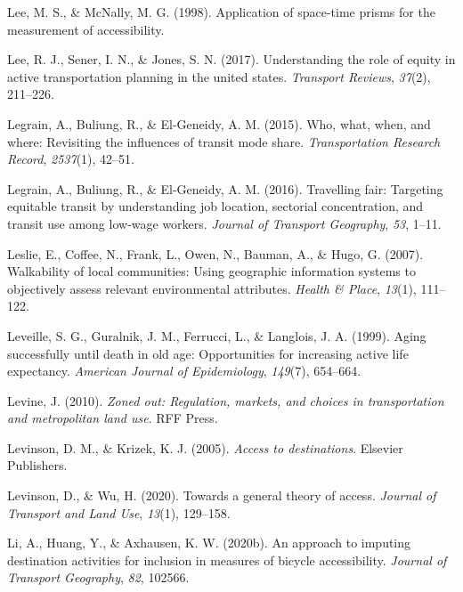 \documentclass[
11pt, %
oneside, %
english, %
singlespacing, %
]{macthesis} %
\newlength{\cslhangindent}
\newenvironment{CSLReferences}[2] %
{\begin{list}{}{%
	\setlength{\itemindent}{0pt}
	\setlength{\leftmargin}{0pt}
	\setlength{\parsep}{0pt}
	\ifodd #1
	\setlength{\leftmargin}{\cslhangindent}
	\setlength{\itemindent}{-1\cslhangindent}
	\fi
	\setlength{\itemsep}{#2\baselineskip}}}
{\end{list}}
\begin{document}
\begin{CSLReferences}{1}{0}
Lee, M. S., \& McNally, M. G. (1998). Application of space-time prisms for the measurement of accessibility.

Lee, R. J., Sener, I. N., \& Jones, S. N. (2017). Understanding the role of equity in active transportation planning in the united states. \emph{Transport Reviews}, \emph{37}(2), 211--226.

Legrain, A., Buliung, R., \& El-Geneidy, A. M. (2015). Who, what, when, and where: Revisiting the influences of transit mode share. \emph{Transportation Research Record}, \emph{2537}(1), 42--51.

Legrain, A., Buliung, R., \& El-Geneidy, A. M. (2016). Travelling fair: Targeting equitable transit by understanding job location, sectorial concentration, and transit use among low-wage workers. \emph{Journal of Transport Geography}, \emph{53}, 1--11.

Leslie, E., Coffee, N., Frank, L., Owen, N., Bauman, A., \& Hugo, G. (2007). Walkability of local communities: Using geographic information systems to objectively assess relevant environmental attributes. \emph{Health \& Place}, \emph{13}(1), 111--122.

Leveille, S. G., Guralnik, J. M., Ferrucci, L., \& Langlois, J. A. (1999). Aging successfully until death in old age: Opportunities for increasing active life expectancy. \emph{American Journal of Epidemiology}, \emph{149}(7), 654--664.

Levine, J. (2010). \emph{Zoned out: Regulation, markets, and choices in transportation and metropolitan land use}. RFF Press.

Levinson, D. M., \& Krizek, K. J. (2005). \emph{Access to destinations}. Elsevier Publishers.

Levinson, D., \& Wu, H. (2020). Towards a general theory of access. \emph{Journal of Transport and Land Use}, \emph{13}(1), 129--158.

Li, A., Huang, Y., \& Axhausen, K. W. (2020b). An approach to imputing destination activities for inclusion in measures of bicycle accessibility. \emph{Journal of Transport Geography}, \emph{82}, 102566.


\end{CSLReferences}
\end{document}
